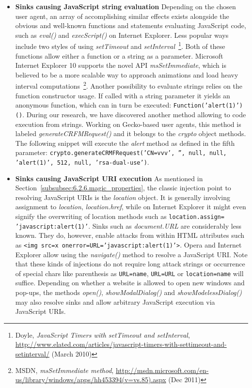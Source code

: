     \begin{itemize}
     \item \textbf{Sinks causing JavaScript string evaluation} Depending on the chosen user agent, an array of accomplishing similar effects exists alongside the obvious and well-known functions and statements evaluating JavaScript code, such as \textit{eval()} and \textit{execScript()} on Internet Explorer. Less popular ways include two styles of using \textit {setTimeout} and \textit{setInterval}~\footnote{Doyle, \textit{JavaScript Timers with setTimeout and setInterval}, \url{http://www.elated.com/articles/javascript-timers-with-settimeout-and-setinterval/} (March 2010)}. Both of these functions allow either a function or a string as a parameter. Microsoft Internet Explorer 10 supports the novel API \textit{msSetImmediate}, which is believed to be a more scalable way to approach animations and load heavy interval computations~\footnote{MSDN, \textit{msSetImmediate method}, \url{http://msdn.microsoft.com/en-us/library/windows/apps/hh453394(v=vs.85).aspx} (Dec 2011)}. Another possibility to evaluate strings relies on the function constructor usage. If called with a string parameter it yields an anonymous function, which can in turn be executed: \texttt{Function('alert(1)')()}. During our research, we have discovered another method allowing to code execution from strings. Working on Gecko-based user agents, this method is labeled \textit{generateCRFMRequest()} and it belongs to the \textit{crypto} object methods. The following snippet will execute the \textit{alert} method as defined in the fifth parameter: \texttt{crypto.generateCRMFRequest('CN=vvv', '', null, null, 'alert(1)', 512, null, 'rsa-dual-use')}.
     \item \textbf{Sinks causing JavaScript URI execution}
     As mentioned in Section~\ref{subsubsec:6.2.6.magic_properties}, the classic injection point to resolving JavaScript URIs is the \textit{location} object. It is generally involving assignment to \textit{location}, \textit{location.href}, while on Internet Explorer it might even signify the overwriting of location methods such as \texttt{location.assign=\\
'javascript:alert(1)'}. Sinks such as \textit{document.URL} are considerably less known. They do, however, enable attacks from within HTML attributes such as \texttt{<img src=x onerror=URL='javascript:alert(1)'>}. Opera and Internet Explorer allow using the \textit{navigate()} method to resolve a JavaScript URI. Note that these kinds of injections do not require long attack strings or occurrence of special chars like parenthesis as \texttt{URL=name}, \texttt{URL=URL} or \texttt{location=name} will suffice. Depending on whether a website is allowed to open new windows and pop-ups, the methods \textit{open()}, \textit{showModalDialog()} and \textit{showModelessDialog()} may also resolve sinks and allow arbitrary JavaScript execution via JavaScript URIs.

\end{itemize}
